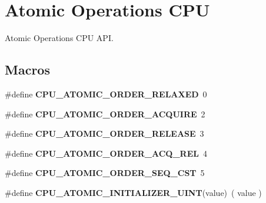 \hypertarget{group__RTEMSScoreCPUAtomic}{}\section{Atomic Operations C\+PU}
\label{group__RTEMSScoreCPUAtomic}


Atomic Operations C\+PU A\+PI.  


\subsection*{Macros}
\begin{DoxyCompactItemize}
\item 
\mbox{\label{group__RTEMSScoreCPUAtomic_ga4df5b8e1eac2ba1ded4f939aa3e31462}} 
\#define {\bfseries C\+P\+U\+\_\+\+A\+T\+O\+M\+I\+C\+\_\+\+O\+R\+D\+E\+R\+\_\+\+R\+E\+L\+A\+X\+ED}~0
\item 
\mbox{\label{group__RTEMSScoreCPUAtomic_ga9671e8f2f76c6eed4c581959fd45c03b}} 
\#define {\bfseries C\+P\+U\+\_\+\+A\+T\+O\+M\+I\+C\+\_\+\+O\+R\+D\+E\+R\+\_\+\+A\+C\+Q\+U\+I\+RE}~2
\item 
\mbox{\label{group__RTEMSScoreCPUAtomic_gaceda499255abac413a9643e5959b99ba}} 
\#define {\bfseries C\+P\+U\+\_\+\+A\+T\+O\+M\+I\+C\+\_\+\+O\+R\+D\+E\+R\+\_\+\+R\+E\+L\+E\+A\+SE}~3
\item 
\mbox{\label{group__RTEMSScoreCPUAtomic_gab33e530931410ee87d875dcbd059f9d2}} 
\#define {\bfseries C\+P\+U\+\_\+\+A\+T\+O\+M\+I\+C\+\_\+\+O\+R\+D\+E\+R\+\_\+\+A\+C\+Q\+\_\+\+R\+EL}~4
\item 
\mbox{\label{group__RTEMSScoreCPUAtomic_ga005dce2d647484a86ccee1e8594f5f1f}} 
\#define {\bfseries C\+P\+U\+\_\+\+A\+T\+O\+M\+I\+C\+\_\+\+O\+R\+D\+E\+R\+\_\+\+S\+E\+Q\+\_\+\+C\+ST}~5
\item 
\mbox{\label{group__RTEMSScoreCPUAtomic_ga346d72c5ef5edcf45e1debf30c01c037}} 
\#define {\bfseries C\+P\+U\+\_\+\+A\+T\+O\+M\+I\+C\+\_\+\+I\+N\+I\+T\+I\+A\+L\+I\+Z\+E\+R\+\_\+\+U\+I\+NT}(value)~( value )
\item 
\mbox{\label{group__RTEMSScoreCPUAtomic_gab92b92702bff4e803ea1efca770ea955}} 

\end{DoxyCompactItemize}
